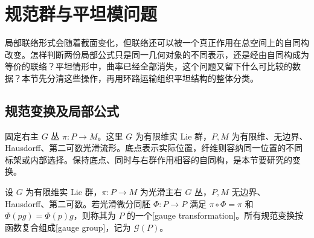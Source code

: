
% 
% 
% 

\section{规范群与平坦模问题}
\label{g1:sec:1804}

局部联络形式会随着截面变化，但联络还可以被一个真正作用在总空间上的自同构改变。怎样判断两份局部公式只是同一几何对象的不同表示，还是经由自同构成为等价的联络？平坦情形中，曲率已经全部消失，这个问题又留下什么可比较的数据？本节先分清这些操作，再用环路运输组织平坦结构的整体分类。

\subsection{规范变换及局部公式}
\label{g1:subsec:1804:01}

固定右主 \(G\) 丛 \(\pi:P\to M\)。这里 \(G\) 为有限维实 Lie 群，\(P,M\) 为有限维、无边界、Hausdorff、第二可数光滑流形。底点表示实际位置，纤维则容纳同一位置的不同标架或内部选择。保持底点、同时与右群作用相容的自同构，是本节要研究的变换。

\begin{definition}\label{g1:def:gauge-group}
	设 \(G\) 为有限维实 Lie 群，\(\pi:P\to M\) 为光滑主右 \(G\) 丛，\(P,M\) 无边界、Hausdorff、第二可数。若光滑微分同胚 \(\Phi:P\to P\) 满足 \(\pi\circ\Phi=\pi\) 和 \(\Phi(pg)=\Phi(p)g\)，则称其为 \(P\) 的一个[gauge transformation]。所有规范变换按函数复合组成[gauge group]，记为 \(\mathcal G(P)\)。
\end{definition}

